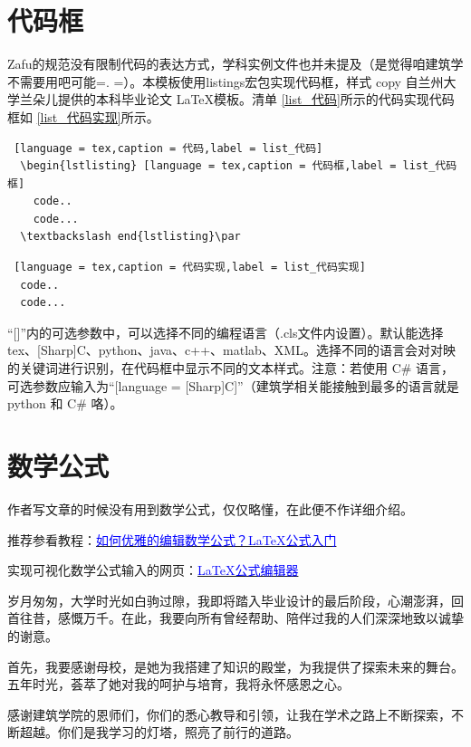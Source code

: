 \documentclass[AutoFakeBold]{ZafuThesis}
\begin{document}
\section{代码框}
Zafu的规范没有限制代码的表达方式，学科实例文件也并未提及（是觉得咱建筑学不需要用吧可能=. =）。本模板使用listings宏包实现代码框，样式 copy 自兰州大学兰朵儿提供的本科毕业论文 \LaTeX 模板。清单 \ref{list_代码}所示的代码实现代码框如 \ref{list_代码实现}所示。

\begin{lstlisting} [language = tex,caption = 代码,label = list_代码]  
  \begin{lstlisting} [language = tex,caption = 代码框,label = list_代码框]
    code..
    code...
  \textbackslash end{lstlisting}\par
  \end{lstlisting}\par 

\begin{lstlisting} [language = tex,caption = 代码实现,label = list_代码实现]
  code..
  code...
\end{lstlisting}\par


“[]”内的可选参数中，可以选择不同的编程语言（.cls文件内设置）。默认能选择tex、[Sharp]C、python、java、c++、matlab、XML。选择不同的语言会对对映的关键词进行识别，在代码框中显示不同的文本样式。注意：若使用 C\# 语言，可选参数应输入为“[language = {[Sharp]C}]”（建筑学相关能接触到最多的语言就是 python 和 C\# 咯）。


\section{数学公式}
作者写文章的时候没有用到数学公式，仅仅略懂，在此便不作详细介绍。\par
推荐参看教程：\href{https://www.bilibili.com/video/BV14g4y1q7pb?vd_source=0332e23098482db275098751af53ce78}{\textcolor{blue}{如何优雅的编辑数学公式？LaTeX公式入门}}\par
实现可视化数学公式输入的网页：\href{www.latexlive.com}{\textcolor{blue}{LaTeX公式编辑器}}

\clearpage



\Thanks
{
  岁月匆匆，大学时光如白驹过隙，我即将踏入毕业设计的最后阶段，心潮澎湃，回首往昔，感慨万千。在此，我要向所有曾经帮助、陪伴过我的人们深深地致以诚挚的谢意。\par
  首先，我要感谢母校，是她为我搭建了知识的殿堂，为我提供了探索未来的舞台。五年时光，荟萃了她对我的呵护与培育，我将永怀感恩之心。\par
  感谢建筑学院的恩师们，你们的悉心教导和引领，让我在学术之路上不断探索，不断超越。你们是我学习的灯塔，照亮了前行的道路。
}
\end{document}
